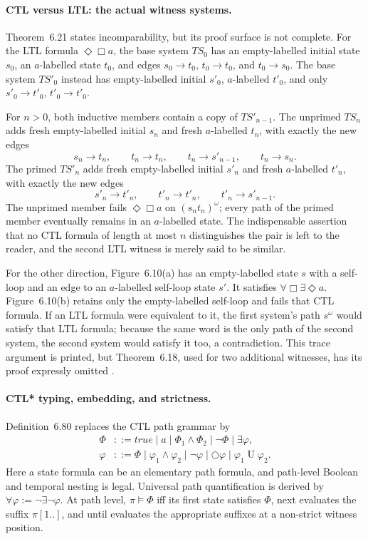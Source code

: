\paragraph{CTL versus LTL: the actual witness systems.}
Theorem~6.21 states incomparability, but its proof surface is not complete.
For the LTL formula \(\Diamond\Box a\), the base system \(TS_0\) has an
empty-labelled initial state \(s_0\), an \(a\)-labelled state \(t_0\), and
edges \(s_0\to t_0\), \(t_0\to t_0\), and \(t_0\to s_0\).  The base system
\(TS'_0\) instead has empty-labelled initial \(s'_0\), \(a\)-labelled
\(t'_0\), and only \(s'_0\to t'_0\), \(t'_0\to t'_0\).

For \(n>0\), both inductive members contain a copy of \(TS'_{n-1}\).
The unprimed \(TS_n\) adds fresh empty-labelled initial \(s_n\) and fresh
\(a\)-labelled \(t_n\), with exactly the new edges
\[
 s_n\to t_n,\qquad t_n\to t_n,
 \qquad t_n\to s'_{n-1},\qquad t_n\to s_n.
\]
The primed \(TS'_n\) adds fresh empty-labelled initial \(s'_n\) and fresh
\(a\)-labelled \(t'_n\), with exactly the new edges
\[
 s'_n\to t'_n,\qquad t'_n\to t'_n,
 \qquad t'_n\to s'_{n-1}.
\]
The unprimed member fails \(\Diamond\Box a\) on
\((s_nt_n)^\omega\); every path of the primed member eventually remains in
an \(a\)-labelled state.  The indispensable assertion that no CTL formula of
length at most \(n\) distinguishes the pair is left to the reader, and the
second LTL witness is merely said to be similar.

For the other direction, Figure~6.10(a) has an empty-labelled state \(s\)
with a self-loop and an edge to an \(a\)-labelled self-loop state \(s'\).  It
satisfies \(\forall\Box\exists\Diamond a\).  Figure~6.10(b) retains only the
empty-labelled self-loop and fails that CTL formula.  If an LTL formula were
equivalent to it, the first system's path \(s^\omega\) would satisfy that LTL
formula; because the same word is the only path of the second system, the
second system would satisfy it too, a contradiction.  This trace argument is
printed, but Theorem~6.18, used for two additional witnesses, has its proof
expressly omitted \cite[pp.~334--340]{BaierKatoen2008}.

\paragraph{CTL* typing, embedding, and strictness.}
Definition~6.80 replaces the CTL path grammar by
\[
\begin{aligned}
 \Phi&::=true\mid a\mid\Phi_1\land\Phi_2\mid\neg\Phi\mid\exists\varphi,\\
 \varphi&::=\Phi\mid\varphi_1\land\varphi_2\mid\neg\varphi
             \mid\bigcirc\varphi\mid\varphi_1\mathbin{U}\varphi_2.
\end{aligned}
\]
Here a state formula can be an elementary path formula, and path-level Boolean
and temporal nesting is legal.  Universal path quantification is derived by
\(\forall\varphi:=\neg\exists\neg\varphi\).  At path level,
\(\pi\models\Phi\) iff its first state satisfies \(\Phi\), next evaluates
the suffix \(\pi[1..]\), and until evaluates the appropriate suffixes at a
non-strict witness position.

